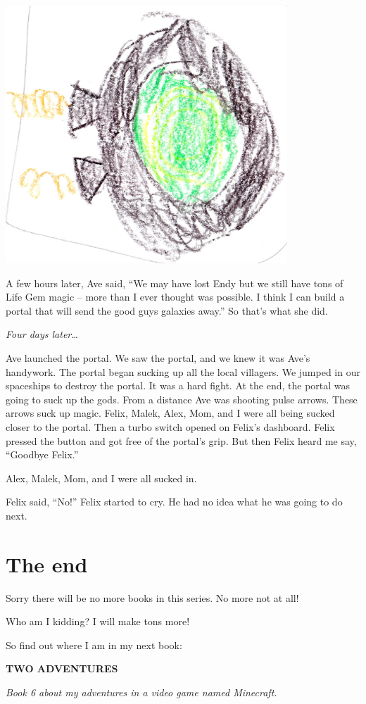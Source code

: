 \documentclass[booklet, twoside, 12pt]{krantz}
\begin{document}
\includegraphics[width=4.16667in,height=\textheight]{img/four-bad-guys/portal.jpg}

A few hours later, Ave said, ``We may have lost Endy but we still have
tons of Life Gem magic -- more than I ever thought was possible. I think
I can build a portal that will send the good guys galaxies away.'' So
that's what she did.

\emph{Four days later\ldots{}}

Ave launched the portal. We saw the portal, and we knew it was Ave's
handywork. The portal began sucking up all the local villagers. We
jumped in our spaceships to destroy the portal. It was a hard fight. At
the end, the portal was going to suck up the gods. From a distance Ave
was shooting pulse arrows. These arrows suck up magic. Felix, Malek,
Alex, Mom, and I were all being sucked closer to the portal. Then a
turbo switch opened on Felix's dashboard. Felix pressed the button and
got free of the portal's grip. But then Felix heard me say, ``Goodbye
Felix.''

Alex, Malek, Mom, and I were all sucked in.

Felix said, ``No!'' Felix started to cry. He had no idea what he was
going to do next.

\hypertarget{the-end-1}{%
\section{The end}\label{the-end-1}}

Sorry there will be no more books in this series. No more not at all!

Who am I kidding? I will make tons more!

So find out where I am in my next book:

\textbf{TWO ADVENTURES}

\emph{Book 6 about my adventures in a video game named Minecraft.}
\end{document}
